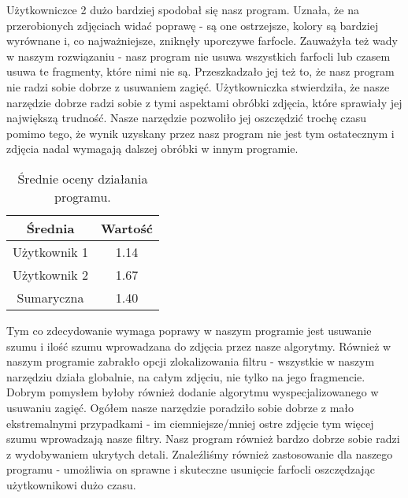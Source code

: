 \documentclass[]{mwart}
\begin{document}
Użytkowniczce 2 dużo bardziej spodobał się nasz program. Uznała, że na przerobionych zdjęciach widać poprawę - są one ostrzejsze, kolory są bardziej wyrównane i, co najważniejsze, zniknęły uporczywe farfocle. Zauważyła też wady w naszym rozwiązaniu - nasz program nie usuwa wszystkich farfocli lub czasem usuwa te fragmenty, które nimi nie są. Przeszkadzało jej też to, że nasz program nie radzi sobie dobrze z usuwaniem zagięć. Użytkowniczka stwierdziła, że nasze narzędzie dobrze radzi sobie z tymi aspektami obróbki zdjęcia, które sprawiały jej największą trudność. Nasze narzędzie pozwoliło jej oszczędzić trochę czasu pomimo tego, że wynik uzyskany przez nasz program nie jest tym ostatecznym i zdjęcia nadal wymagają dalszej obróbki w innym programie.

\begin{table}[H]
    \centering
    \begin{tabular}{|c|c|}
        \hline
        Średnia      & Wartość \\ \hline
        Użytkownik 1 & 1.14    \\ \hline
        Użytkownik 2 & 1.67    \\ \hline
        Sumaryczna   & 1.40    \\ \hline
    \end{tabular}
    \caption{Średnie oceny działania programu.}
\end{table}

Tym co zdecydowanie wymaga poprawy w naszym programie jest usuwanie szumu i ilość szumu wprowadzana do zdjęcia przez nasze algorytmy. Również w naszym programie zabrakło opcji zlokalizowania filtru - wszystkie w naszym narzędziu działa globalnie, na całym zdjęciu, nie tylko na jego fragmencie. Dobrym pomysłem byłoby również dodanie algorytmu wyspecjalizowanego w usuwaniu zagięć. Ogółem nasze narzędzie poradziło sobie dobrze z mało ekstremalnymi przypadkami - im ciemniejsze/mniej ostre zdjęcie tym więcej szumu wprowadzają nasze filtry. Nasz program również bardzo dobrze sobie radzi z wydobywaniem ukrytych detali. Znaleźliśmy również zastosowanie dla naszego programu - umożliwia on sprawne i skuteczne usunięcie farfocli oszczędzając użytkownikowi dużo czasu.
\end{document}
